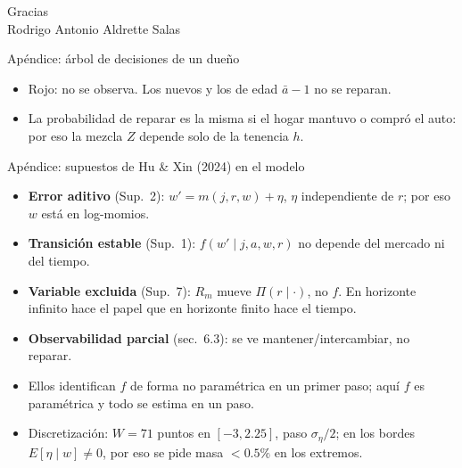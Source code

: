 \documentclass[aspectratio=169,11pt]{beamer}
\begin{document}
\begin{frame}
  \centering\Large Gracias\\[1em]
  \normalsize Rodrigo Antonio Aldrette Salas
\end{frame}

\appendix

\begin{frame}{Apéndice: árbol de decisiones de un dueño}
  \centering
  \begin{itemize}\small
    \item Rojo: no se observa. Los nuevos y los de edad $\bar a-1$ no se reparan.
    \item La probabilidad de reparar es la misma si el hogar mantuvo o compró el auto:
          por eso la mezcla $Z$ depende solo de la tenencia $h$.
  \end{itemize}
\end{frame}

\begin{frame}{Apéndice: supuestos de Hu \& Xin (2024) en el modelo}
  \begin{itemize}
    \item \textbf{Error aditivo} (Sup.\ 2): $w'=m(j,r,w)+\eta$, $\eta$ independiente de
          $r$; por eso $w$ está en log-momios.
    \item \textbf{Transición estable} (Sup.\ 1): $f(w'\mid j,a,w,r)$ no depende del
          mercado ni del tiempo.
    \item \textbf{Variable excluida} (Sup.\ 7): $R_m$ mueve $\Pi(r\mid\cdot)$, no $f$. En
          horizonte infinito hace el papel que en horizonte finito hace el tiempo.
    \item \textbf{Observabilidad parcial} (sec.\ 6.3): se ve mantener/intercambiar, no
          reparar.
    \item Ellos identifican $f$ de forma no paramétrica en un primer paso; aquí $f$ es
          paramétrica y todo se estima en un paso.
    \item Discretización: $W=71$ puntos en $[-3,2.25]$, paso $\sigma_\eta/2$; en los bordes
          $E[\eta\mid w]\neq0$, por eso se pide masa $<0.5\%$ en los extremos.
  \end{itemize}
\end{frame}
\end{document}
